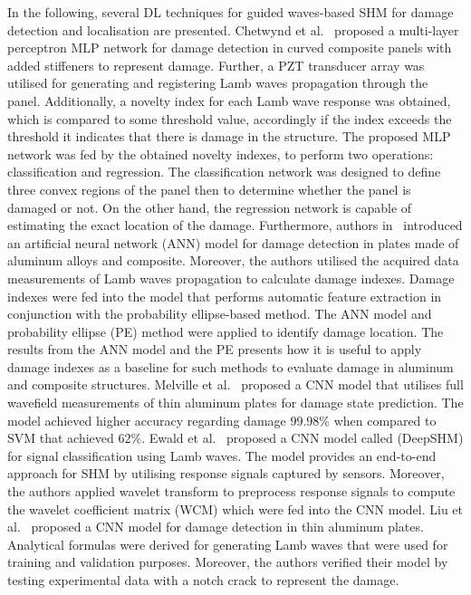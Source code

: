 In the following, several DL techniques for guided waves-based SHM for damage detection and localisation are presented.
Chetwynd et al.~\cite{Chetwynd2008} proposed a multi-layer perceptron MLP network for damage detection in curved composite panels with added stiffeners to represent damage.
Further, a PZT transducer array was utilised for generating and registering Lamb waves propagation through the panel.
Additionally, a novelty index for each Lamb wave response was obtained,
which is compared to some threshold value, accordingly if the
index exceeds the threshold it indicates that there is damage in
the structure. 
The proposed MLP network was fed by the obtained novelty indexes, to perform two operations: classification and regression. 
The classification network was designed to define three convex regions of the panel then to determine whether the panel is damaged or not. 
On the other hand, the regression network is capable of estimating the exact location of the damage. 
Furthermore, authors in~\cite{DeFenza2015} introduced an artificial neural network (ANN) model for damage detection in plates made of aluminum alloys and composite.
Moreover, the authors utilised the acquired data measurements of Lamb waves propagation to calculate damage indexes.
Damage indexes were fed into the model that performs automatic feature extraction in conjunction with the probability ellipse-based method. 
The ANN model and probability ellipse (PE) method were applied to identify damage location.
The results from the ANN model and the PE presents how it is useful to apply damage indexes as a baseline for such methods to evaluate damage in aluminum and composite structures. 
Melville et al.~\cite{Melville2018} proposed a CNN model that utilises full wavefield measurements of thin aluminum plates for damage state prediction.
The model achieved higher accuracy regarding damage \(99.98\%\) when compared to SVM that achieved \(62\%\).
Ewald et al.~\cite{Ewald2019} proposed a CNN model called (DeepSHM) for signal classification using Lamb waves.
The model provides an end-to-end approach for SHM by utilising response signals captured by sensors.
Moreover, the authors applied wavelet transform to preprocess response signals to compute the wavelet coefficient matrix (WCM) which were fed into the CNN model.
Liu et al.~\cite{Liu2020} proposed a CNN model for damage detection in thin aluminum plates.
Analytical formulas were derived for generating Lamb waves that were used for training and validation purposes.
Moreover, the authors verified their model by testing experimental data with a notch crack to represent the damage.
